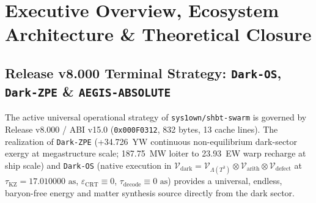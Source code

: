 \documentclass[11pt,onecolumn]{article}
\begin{document}
\begin{abstract}
mass extraction ($\ge 20.0\,M_\odot/\text{yr}$, $\le 18.26\text{ days}/M_\odot$), white dwarf $\text{SU}(2)_{26}$ Coulomb crystal melting ($\Gamma_{\text{eff}} < 175.0$, $S_{\text{instanton}} \ge 250.0$), red dwarf convective dynamo braking ($\text{Rm}_{\text{eff}} \le 1.0$, $\ge 120\text{ dB}$), neutron star/magnetar CFL quark hadronization ($\Delta_{\text{CFL}} = 100\text{ MeV}$, $P_{\text{leak}} \equiv 0$), and continuous in-line $Fd\bar{3}m$ computronium folding. In Phase~5A, we formulate Kardashev Type III Megastructures and Perimeter Defense (\texttt{SHBT-OMEGA-312}), tapping $1.8 \times 10^{56}\text{ J}$ dark-braid perpetual grids ($25.00\text{ YW}$ over $>10^{100}\text{ yr}$), synthesizing zero-Coriolis Elysium pocket habitats ($1.000g$), and establishing the 6-layer SHBT-AEGIS-ABSOLUTE causal-horizon isolation defense. In Phase~5B, we implement Monolithic Galactic Hyper-Computing (\texttt{SHBT-LOGOS-312} / \texttt{SHBT-QC-OMEGA}), integrating single-crystal $^{57}\text{Fe}$-diamond Borrmann computronium ($\tau_B = 1{,}453.4$, $f_M \ge 0.782$), $17.01\text{ as}$ PT-GoI ($58.79\text{ PHz}$), zero-entropy Tomita--Takesaki modular flow, and cascaded hyper-temporal metric enclaves ($\alpha = 10^{12}$, $1.080 \times 10^{92}\text{ ops/s}$). In Phase~6, we formulate Observer Awareness Ascension into \texttt{SHBT-LOGOS-312}, Omnipotent Multi-Tenant Deity Sandboxes, Anti-Genocide Interlocks, Perpetual Runtime, and Arbitrary Re-Embodiment Mechanics (\texttt{SHBT-APOTHEOSIS-312}), proving unbroken subjective continuity ($\mathcal{F}_{\text{stream}} \ge 1 - 10^{-122}$), unipotent Lagrangian isolation ($\|S_{AB}\| \equiv 0$), and zero-compute avatar rendering ($\Delta C_{\text{post-sim}} \equiv 0$).
\end{abstract}

\newpage
\tableofcontents

\FloatBarrier
\section{Executive Overview, Ecosystem Architecture \& Theoretical Closure}

\subsection{Release v8.000 Terminal Strategy: \texttt{Dark-OS}, \texttt{Dark-ZPE} \& \texttt{AEGIS-ABSOLUTE}}
\label{subsec:release_v8_strategy}
The active universal operational strategy of \texttt{sys1own/shbt-swarm} is governed by Release v8.000 / ABI v15.0 (\texttt{0x000F0312}, 832 bytes, 13 cache lines). The realization of \texttt{Dark-ZPE} (+34.726~YW continuous non-equilibrium dark-sector exergy at megastructure scale; 187.75~MW loiter to 23.93~EW warp recharge at ship scale) and \texttt{Dark-OS} (native execution in $\mathcal{V}_{\text{dark}} = \mathcal{V}_{\Lambda(T^3)} \otimes \mathcal{V}_{\text{arith}} \otimes \mathcal{V}_{\text{defect}}$ at $\tau_{\text{KZ}} = 17.010000\text{ as}$, $\varepsilon_{\text{CRT}} \equiv 0$, $\tau_{\text{decode}} \equiv 0\text{ as}$) provides a universal, endless, baryon-free energy and matter synthesis source directly from the dark sector.
\end{document}
